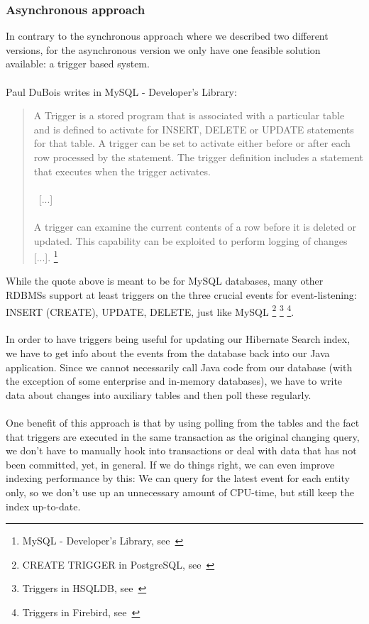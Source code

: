 \subsubsection{Asynchronous approach}\label{async_approach}
In contrary to the synchronous approach where we described two different versions, for the asynchronous version we only have one feasible solution available: a trigger based system.
\\\\
Paul DuBois writes in MySQL - Developer's Library:
\begin{quote}
	A Trigger is a stored program that is associated with a particular table and is defined to activate for INSERT, DELETE or UPDATE statements for that table. A trigger can be set to activate either before or after each row processed by the statement. The trigger definition includes a statement that executes when the trigger activates.
	\\\\
	~[...]~
	\\\\
	A trigger can examine the current contents of a row before it is deleted or updated. This capability can be exploited to perform logging of changes [...].
	\footnote{MySQL - Developer's Library, see~\cite{mysql_developers_lib}}
\end{quote}
\noindent
While the quote above is meant to be for MySQL databases, many other RDBMSs support at least triggers on the three crucial events for event-listening: INSERT (CREATE), UPDATE, DELETE, just like MySQL \footnote{CREATE TRIGGER in PostgreSQL, see~\cite{postgres_triggers}} \footnote{Triggers in HSQLDB, see~\cite{hsqldb_triggers}} \footnote{Triggers in Firebird, see~\cite{firebird_triggers}}.
\\\\
In order to have triggers being useful for updating our Hibernate Search index, we have to get info about the events from the database back into our Java application. Since we cannot necessarily call Java code from our database (with the exception of some enterprise and in-memory databases), we have to write data about changes into auxiliary tables and then poll these regularly.
\\\\
One benefit of this approach is that by using polling from the tables and the fact that triggers are executed in the same transaction as the original changing query, we don't have to manually hook into transactions or deal with data that has not been committed, yet, in general. If we do things right, we can even improve indexing performance by this: We can query for the latest event for each entity only, so we don't use up an unnecessary amount of CPU-time, but still keep the index up-to-date.

